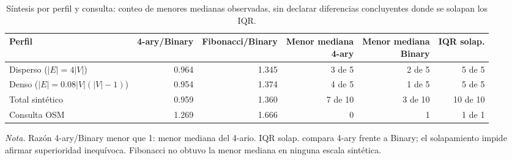 \begin{table}[H]
\centering
\fontsize{8.5}{10.5}\selectfont
\renewcommand{\arraystretch}{1.15}
\setlength{\tabcolsep}{4pt}
\caption{Síntesis por perfil y consulta: conteo de menores medianas observadas, sin declarar diferencias concluyentes donde se solapan los IQR.}
\label{tab:sintesis_colas}
\begin{tabular}{@{}lrrrrr@{}}
\toprule
\textbf{Perfil} & \textbf{4-ary/Binary} & \textbf{Fibonacci/Binary} & \makecell{Menor mediana\\4-ary} & \makecell{Menor mediana\\Binary} & \textbf{IQR solap.} \\
\midrule
Disperso ($|E|=4|V|$) & 0.964 & 1.345 & 3 de 5 & 2 de 5 & 5 de 5 \\
Denso ($|E|=0.08|V|(|V|-1)$) & 0.954 & 1.374 & 4 de 5 & 1 de 5 & 5 de 5 \\
\midrule
Total sintético & 0.959 & 1.360 & 7 de 10 & 3 de 10 & 10 de 10 \\
Consulta OSM & 1.269 & 1.666 & 0 & 1 & 1 de 1 \\
\bottomrule
\end{tabular}
\par\vspace{0.1cm}
\raggedright\fontsize{8}{10}\selectfont\textit{Nota.} Razón 4-ary/Binary menor que 1: menor mediana del 4-ario. IQR solap. compara 4-ary frente a Binary; el solapamiento impide afirmar superioridad inequívoca. Fibonacci no obtuvo la menor mediana en ninguna escala sintética.
\end{table}
